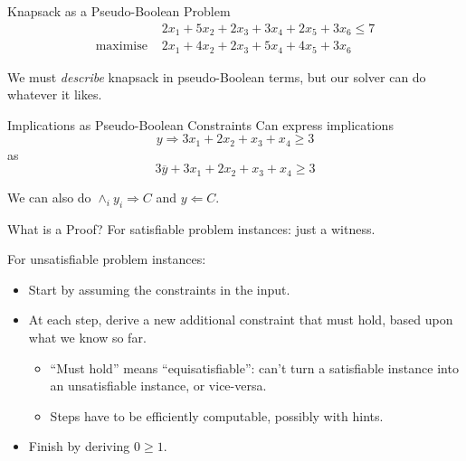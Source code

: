 \documentclass[aspectratio=169,compress,10pt]{beamer}
\begin{document}
\begin{frame}{Knapsack as a Pseudo-Boolean Problem}
    \begin{align*}
        &2 x_1 + 5 x_2 + 2 x_3 + 3 x_4 + 2 x_5 + 3 x_6 \le 7 \\
        \text{maximise~} &2 x_1 + 4 x_2 + 2 x_3 + 5 x_4 + 4 x_5 + 3 x_6
    \end{align*}

    \bigskip

    We must \emph{describe} knapsack in pseudo-Boolean terms, but our solver can do
    whatever it likes.
\end{frame}

\begin{frame}{Implications as Pseudo-Boolean Constraints}
    Can express implications
    \begin{equation*} y \Rightarrow 3x_1 + 2x_2 + x_3 + x_4 \ge 3 \end{equation*}
    as
    \begin{equation*}
    3\overline{y} + 3x_1 + 2x_2 + x_3 + x_4 \ge 3
    \end{equation*}

    \bigskip

    We can also do $\land_i y_i \Rightarrow C$ and $y \Leftarrow C$.
\end{frame}

\begin{frame}{What is a Proof?}
        For satisfiable problem instances: just a witness.

        \bigskip\pause

        For unsatisfiable problem instances:
        \begin{itemize}
            \item Start by assuming the constraints in the input.
            \item At each step, derive a new additional constraint that must hold,
                based upon what we know so far.
                \begin{itemize}
                    \item ``Must hold'' means ``equisatisfiable'': can't turn a satisfiable
                        instance into an unsatisfiable instance, or vice-versa.
                    \item Steps have to be efficiently computable, possibly with hints.
                \end{itemize}
            \item Finish by deriving $0 \ge 1$.
        \end{itemize}
\end{frame}
\end{document}
